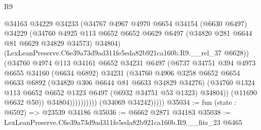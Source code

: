 \begin{lexlean}{R9}
\begin{coremodule}
                              @34163
                              @34229
                              @34233
                              (@34767
                                @4967
                                @4970
                                @6654
                                @34154
                                (@6630 @6497)
                                @34229
                                (@34760
                                  @4925
                                  @113
                                  @6652
                                  @6652
                                  @6629
                                  @6497
                                  (@34820 @281 @6644 @81 @6629 @34829 @34573)
                                  @34804)
                                (LexLeanPreserve.C6e39a73d9ad311fe5eda82b921ca160b.R9.__rel_37
                                  @6628))
                              (@34760
                                @4974
                                @113
                                @34161
                                @6652
                                @34231
                                @6497
                                (@6737
                                  @34751
                                  @394
                                  @4973
                                  @6655
                                  @34160
                                  (@6634 @6892)
                                  @34231
                                  (@34760
                                    @4906
                                    @3258
                                    @6652
                                    @6654
                                    @6633
                                    @6892
                                    (@34820 @306 @6644 @81 @6633 @34829 @34276)
                                    (@34760
                                      @1324
                                      @113
                                      @6652
                                      @6652
                                      @1323
                                      @6497
                                      (@6932 @34751 @53 @1323)
                                      @34804))
                                  (@11690 @6632 @50))
                                @34804))))))))))
            (@34069 @34242)))))
@35034 := fun (state : @6592) => @23539 @34186
@35036 := @6662 @2871 @34183
@35038 := LexLeanPreserve.C6e39a73d9ad311fe5eda82b921ca160b.R9.__fits_23 @6465

\end{coremodule}
\end{lexlean}
